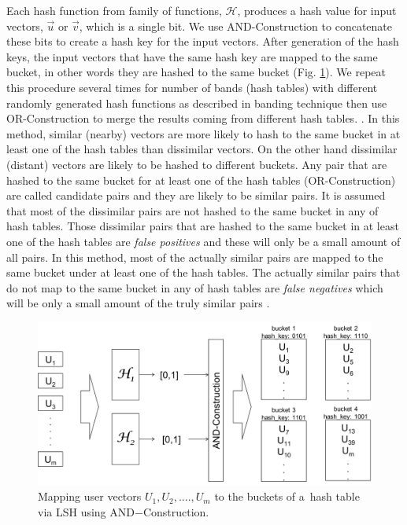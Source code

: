 \documentclass[conference]{IEEEtran}
\begin{document}
Each hash function from family of functions, $\mathcal{H}$, produces a hash 
value for input vectors, $\vec{u}$ or $\vec{v}$, which is a single bit. We use
AND-Construction to concatenate these bits to create a hash key for the input
vectors. After generation of the hash keys, the input vectors that have the 
same hash key are mapped to the same bucket, in other words they are hashed to 
the same bucket (Fig. \ref{fig:lsh-illustra}). We repeat this procedure several
times for number of bands (hash tables) with different randomly generated hash
functions as described in banding technique then use OR-Construction to merge 
the results coming from different hash tables. \cite{Rajaraman:2011:MMD:2124405}. 
In this method, similar (nearby) vectors are more likely to hash to the same 
bucket in at least one of the hash tables than dissimilar vectors. On the other
hand dissimilar (distant) vectors are likely to be hashed to different buckets.
Any pair that are hashed to the same bucket for at least one of the hash tables 
(OR-Construction) are called candidate pairs and they are likely to be similar 
pairs. It is assumed that most of the dissimilar pairs are not hashed to the 
same bucket in any of hash tables. Those dissimilar pairs that are hashed to 
the same bucket in at least one of the hash tables are \textit{false positives}
and these will only be a small amount of all pairs. In this method, most of the
actually similar pairs are mapped to the same bucket under at least one of the 
hash tables. The actually similar pairs that do not map to the same bucket in 
any of hash tables are \textit{false negatives} which will be only a small 
amount of the truly similar pairs \cite{Rajaraman:2011:MMD:2124405}. 
\begin{figure}[h]
   \center
   \includegraphics[scale=0.3]{lsh.png}
   \caption{Mapping user vectors ${U_1, U_2, ...., U_m}$ to the buckets of a\
   hash table via LSH using AND$-$Construction.}
   \label{fig:lsh-illustra}
\end{figure}
\end{document}
